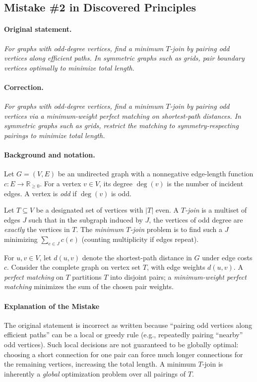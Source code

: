 \documentclass{article}
\theoremstyle{plain}
\theoremstyle{definition}
\theoremstyle{remark}
\begin{document}
\subsection{Mistake \#2 in Discovered Principles}
\label{sec:explanation-mistake-2}

\paragraph{Original statement.}
\emph{For graphs with odd-degree vertices, find a minimum \(T\)-join by pairing odd vertices along efficient paths. In symmetric graphs such as grids, pair boundary vertices optimally to minimize total length.}

\paragraph{Correction.}
\emph{For graphs with odd-degree vertices, find a minimum \(T\)-join by pairing odd vertices via a minimum-weight perfect matching on shortest-path distances. In symmetric graphs such as grids, restrict the matching to symmetry-respecting pairings to minimize total length.}

\paragraph{Background and notation.}
Let \(G=(V,E)\) be an undirected graph with a nonnegative edge-length function \(c:E\to \mathbb{R}_{\ge 0}\).
For a vertex \(v\in V\), its degree \(\deg(v)\) is the number of incident edges.
A vertex is \emph{odd} if \(\deg(v)\) is odd.

Let \(T\subseteq V\) be a designated set of vertices with \(|T|\) even.
A \emph{\(T\)-join} is a multiset of edges \(J\) such that in the subgraph induced by \(J\),
the vertices of odd degree are \emph{exactly} the vertices in \(T\).
The \emph{minimum \(T\)-join} problem is to find such a \(J\) minimizing \(\sum_{e\in J} c(e)\) (counting multiplicity if edges repeat).

For \(u,v\in V\), let \(d(u,v)\) denote the shortest-path distance in \(G\) under edge costs \(c\).
Consider the complete graph on vertex set \(T\), with edge weights \(d(u,v)\).
A \emph{perfect matching} on \(T\) partitions \(T\) into disjoint pairs; a \emph{minimum-weight perfect matching} minimizes the sum of the chosen pair weights.

\paragraph{Explanation of the Mistake}
The original statement is incorrect as written because ``pairing odd vertices along efficient paths'' can be a local or greedy rule (e.g., repeatedly pairing ``nearby'' odd vertices).
Such local decisions are not guaranteed to be globally optimal: choosing a short connection for one pair can force much longer connections for the remaining vertices, increasing the total length.
A minimum \(T\)-join is inherently a \emph{global} optimization problem over all pairings of \(T\).
\end{document}

